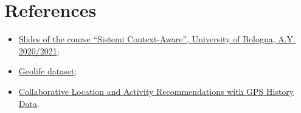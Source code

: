 \documentclass[../main]{subfiles}
\begin{document}
\section{References}
\label{s:references}

\begin{itemize}
    \item \href{https://virtuale.unibo.it/course/view.php?id=18236}{Slides of the course ``Sistemi Context-Aware'', University of Bologna, A.Y. 2020/2021};
    \item \label{ref:geolife}\href{https://www.microsoft.com/en-us/download/details.aspx?id=52367&from=https%3A%2F%2Fresearch.microsoft.com%2Fen-us%2Fdownloads%2Fb16d359d-d164-469e-9fd4-daa38f2b2e13%2F}{Geolife dataset};
    \item \label{ref:clar}\href{https://home.cse.ust.hk/~qyang/Docs/2010/www10_clar_2.pdf}{Collaborative Location and Activity Recommendations with GPS History Data}.
\end{itemize}
\end{document}
